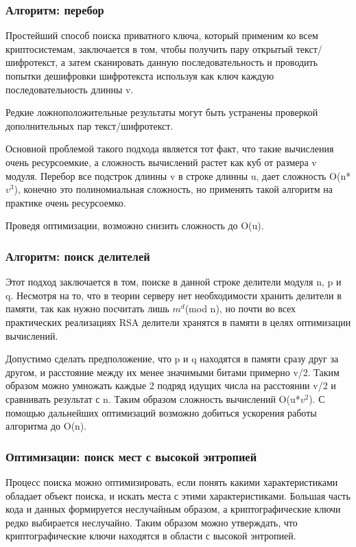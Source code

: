 \documentclass[20pt]{article}
\begin{document}
\subsubsection{Алгоритм: перебор}
Простейший способ поиска приватного ключа, который применим ко всем
криптосистемам, заключается в том, чтобы получить пару открытый текст/шифротекст,
а затем сканировать данную последовательность и проводить попытки дешифровки
шифротекста используя как ключ каждую последовательность длинны v.

Редкие ложноположительные результаты могут быть устранены проверкой
дополнительных пар текст/шифротекст.

Основной проблемой такого подхода является тот факт, что такие вычисления очень
ресурсоемкие, а сложность вычислений растет как куб от размера v модуля.
Перебор все подстрок длинны v в строке длинны u, дает сложность O(n*$v^3$),
конечно это полиномиальная сложность, но применять такой алгоритм на практике
очень ресурсоемко.

Проведя оптимизации, возможно снизить сложность до O(u).

\subsubsection{Алгоритм: поиск делителей}
Этот подход заключается в том, поиске в данной строке делители модуля n, p и q.
Несмотря на то, что в теории серверу нет необходимости хранить делители в
памяти, так как нужно посчитать лишь $m^d$(mod n), но почти во всех практических
реализациях RSA делители хранятся в памяти в целях оптимизации вычислений.

Допустимо сделать предположение, что p и q находятся в памяти сразу друг за другом,
и расстояние между их менее значимыми битами примерно v/2. Таким образом можно
умножать каждые 2 подряд идущих числа на расстоянии v/2 и сравнивать результат с
n. Таким образом сложность вычислений O(u*$v^2$). С помощью дальнейших оптимизаций
возможно добиться ускорения работы алгоритма до O(n).

\subsubsection{Оптимизации: поиск мест с высокой энтропией}
Процесс поиска можно оптимизировать, если понять какими характеристиками обладает
объект поиска, и искать места с этими характеристиками. Большая часть кода и данных
формируется неслучайным образом, а криптографические ключи редко выбирается
неслучайно. Таким образом можно утверждать, что криптографические ключи находятся
в области с высокой энтропией.
\end{document}
